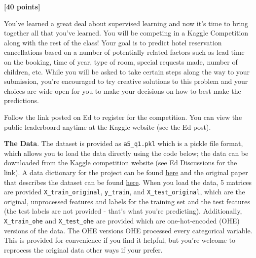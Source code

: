 \documentclass[
  letterpaper,
  DIV=11,
  numbers=noendperiod]{scrartcl}
\begin{document}
\textbf{{[}40 points{]}}

You've learned a great deal about supervised learning and now it's time
to bring together all that you've learned. You will be competing in a
Kaggle Competition along with the rest of the class! Your goal is to
predict hotel reservation cancellations based on a number of potentially
related factors such as lead time on the booking, time of year, type of
room, special requests made, number of children, etc. While you will be
asked to take certain steps along the way to your submission, you're
encouraged to try creative solutions to this problem and your choices
are wide open for you to make your decisions on how to best make the
predictions.

\begin{tcolorbox}[enhanced jigsaw, opacityback=0, leftrule=.75mm, left=2mm, opacitybacktitle=0.6, coltitle=black, colback=white, colbacktitle=quarto-callout-important-color!10!white, colframe=quarto-callout-important-color-frame, toptitle=1mm, toprule=.15mm, rightrule=.15mm, bottomtitle=1mm, breakable, titlerule=0mm, title=\textcolor{quarto-callout-important-color}{\faExclamation}\hspace{0.5em}{Important note}, arc=.35mm, bottomrule=.15mm]

Follow the link posted on Ed to register for the competition. You can
view the public leaderboard anytime at the Kaggle website (see the Ed
post).

\end{tcolorbox}

\textbf{The Data}. The dataset is provided as \texttt{a5\_q1.pkl} which
is a pickle file format, which allows you to load the data directly
using the code below; the data can be downloaded from the Kaggle
competition website (see Ed Discussions for the link). A data dictionary
for the project can be found
\href{https://github.com/rfordatascience/tidytuesday/blob/master/data/2020/2020-02-11/readme.md}{here}
and the original paper that describes the dataset can be found
\href{https://www.sciencedirect.com/science/article/pii/S2352340918315191}{here}.
When you load the data, 5 matrices are provided
\texttt{X\_train\_original}, \texttt{y\_train}, and
\texttt{X\_test\_original}, which are the original, unprocessed features
and labels for the training set and the test features (the test labels
are not provided - that's what you're predicting). Additionally,
\texttt{X\_train\_ohe} and \texttt{X\_test\_ohe} are provided which are
one-hot-encoded (OHE) versions of the data. The OHE versions OHE
processed every categorical variable. This is provided for convenience
if you find it helpful, but you're welcome to reprocess the original
data other ways if your prefer.
\end{document}
